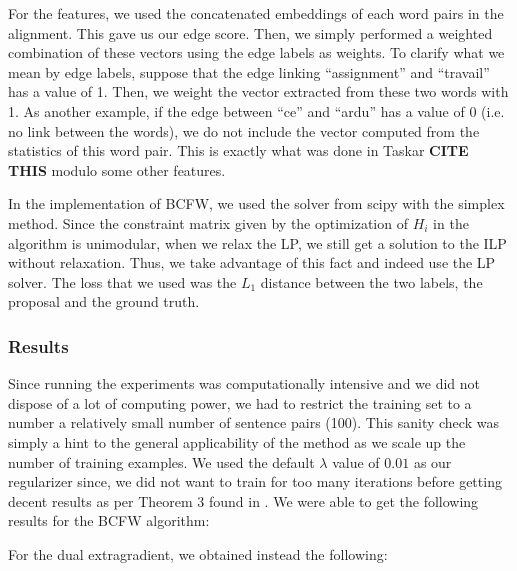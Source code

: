 For the features, we used the concatenated
embeddings of each word pairs in the alignment. This gave us our edge score.
Then, we simply performed a weighted combination of these vectors using the edge
labels as weights. To clarify what we mean by edge labels, suppose that the edge
linking ``assignment'' and ``travail'' has a value of 1. Then, we weight the
vector extracted from these two words with 1. As another example, if the edge
between ``ce'' and ``ardu'' has a value of 0 (i.e. no link between the words),
we do not include the vector computed from the statistics of this word pair.
This is exactly what was done in Taskar \textbf{CITE THIS} modulo some
other features.

In the implementation of BCFW, we used the solver from scipy with the simplex
method. Since the constraint matrix given by the optimization of $H_i$ in the
algorithm is unimodular, when we relax the LP, we still get a solution to the
ILP without relaxation. Thus, we take advantage of this fact and indeed use the
LP solver. The loss that we used was the $L_1$ distance between the two labels,
the proposal and the ground truth.

\subsubsection{Results}
Since running the experiments was computationally intensive and we did not dispose of a
lot of computing power, we had to restrict the training set to a number a relatively small
number of sentence pairs (100). This sanity check was simply a hint to the general applicability 
of the method as we scale up the number of training examples. We used the default $\lambda$ value
of $0.01$ as our regularizer since, we did not want to train for too many iterations before
getting decent results as per Theorem 3 found in
\citet{lacoste-julienBlockCoordinateFrankWolfeOptimization2013}. We were able to
get the following results for the BCFW algorithm:



For the dual extragradient, we obtained instead the following:


